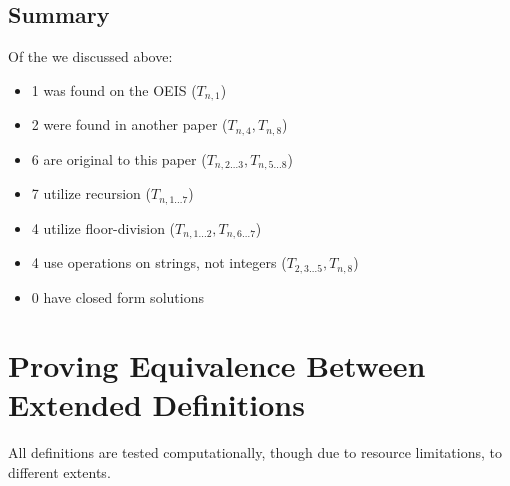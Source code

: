 \documentclass[conference]{IEEEtran}
\begin{document}
\subsection{Summary}

Of the \TotalExtensions we discussed above:
\begin{itemize}
    \item 1 was found on the OEIS ($T_{n,1}$)
    \item 2 were found in another paper ($T_{n,4}, T_{n,8}$)
    \item 6 are original to this paper ($T_{n,2\dots3}, T_{n,5\dots8}$)
    \\%
    \item 7 utilize recursion ($T_{n,1\dots7}$)
    \item 4 utilize floor-division ($T_{n,1\dots2}, T_{n,6\dots7}$)
    \item 4 use operations on strings, not integers ($T_{2,3\dots5}, T_{n,8}$)
    \item 0 have closed form solutions
\end{itemize}

\section{Proving Equivalence Between Extended Definitions}

All definitions are tested computationally, though due to resource limitations, to different extents.
\end{document}
